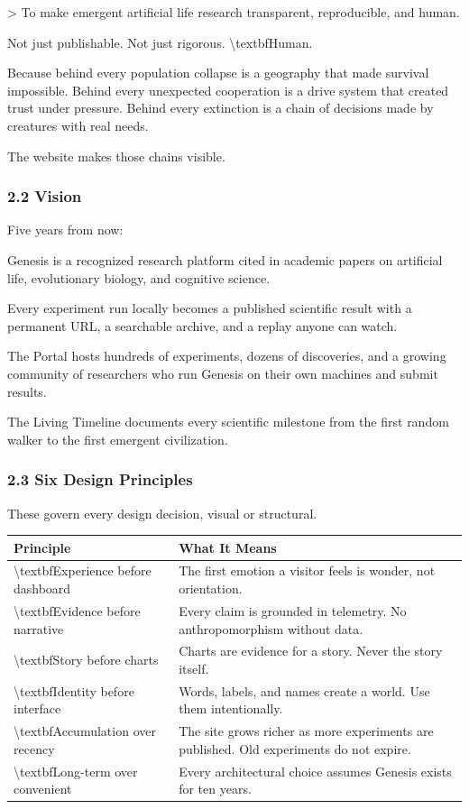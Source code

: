 \documentclass[11pt,a4paper]{article}
\begin{document}
\textgreater{} To make emergent artificial life research transparent, reproducible, and human.

Not just publishable.
Not just rigorous.
\textbackslash{}textbf{Human.}

Because behind every population collapse is a geography that made survival impossible. Behind every unexpected cooperation is a drive system that created trust under pressure. Behind every extinction is a chain of decisions made by creatures with real needs.

The website makes those chains visible.

\subsubsection*{2.2 Vision}

Five years from now:

Genesis is a recognized research platform cited in academic papers on artificial life, evolutionary biology, and cognitive science.

Every experiment run locally becomes a published scientific result  with a permanent URL, a searchable archive, and a replay anyone can watch.

The Portal hosts hundreds of experiments, dozens of discoveries, and a growing community of researchers who run Genesis on their own machines and submit results.

The Living Timeline documents every scientific milestone from the first random walker to the first emergent civilization.

\subsubsection*{2.3 Six Design Principles}

These govern every design decision, visual or structural.

\begin{longtable}{ll}
\toprule
Principle & What It Means \\
\midrule
\endhead
\textbackslash{}textbf{Experience before dashboard} & The first emotion a visitor feels is wonder, not orientation. \\
\textbackslash{}textbf{Evidence before narrative} & Every claim is grounded in telemetry. No anthropomorphism without data. \\
\textbackslash{}textbf{Story before charts} & Charts are evidence for a story. Never the story itself. \\
\textbackslash{}textbf{Identity before interface} & Words, labels, and names create a world. Use them intentionally. \\
\textbackslash{}textbf{Accumulation over recency} & The site grows richer as more experiments are published. Old experiments do not expire. \\
\textbackslash{}textbf{Long-term over convenient} & Every architectural choice assumes Genesis exists for ten years. \\
\bottomrule
\end{longtable}
\end{document}
